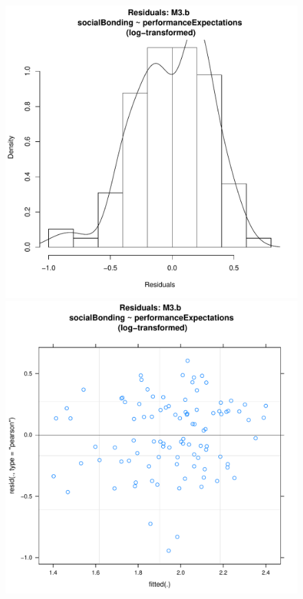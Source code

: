 \begin{CJK}{UTF8}{gbsn}
      \begin{figure}[htbp]
        \includegraphics[scale =.4]{images/MLM3bLogHist.pdf}
        \includegraphics[scale =.4]{images/MLM3bLogScatter.pdf}

\end{figure}
\end{CJK}
